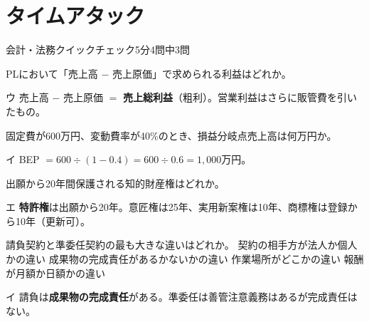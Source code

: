 \section{タイムアタック}

\begin{timeattack}{会計・法務クイックチェック}{5分}{4問中3問}

\begin{itpmon}[\diffbadge{基}]{PLにおいて「売上高 $-$ 売上原価」で求められる利益はどれか。}
\end{itpmon}
\begin{kaisetsu}{ウ}
売上高 $-$ 売上原価 $=$ \textbf{売上総利益}（粗利）。営業利益はさらに販管費を引いたもの。
\end{kaisetsu}

\begin{itpmon}[\diffbadge{標}]{固定費が600万円、変動費率が40\%のとき、損益分岐点売上高は何万円か。}
\end{itpmon}
\begin{kaisetsu}{イ}
BEP $= 600 \div (1 - 0.4) = 600 \div 0.6 = 1{,}000$万円。
\end{kaisetsu}

\begin{itpmon}[\diffbadge{基}]{出願から20年間保護される知的財産権はどれか。}
\end{itpmon}
\begin{kaisetsu}{エ}
\textbf{特許権}は出願から20年。意匠権は25年、実用新案権は10年、商標権は登録から10年（更新可）。
\end{kaisetsu}

\begin{itpmon}[\diffbadge{標}]{請負契約と準委任契約の最も大きな違いはどれか。}
\sentakushi
  {契約の相手方が法人か個人かの違い}
  {成果物の完成責任があるかないかの違い}
  {作業場所がどこかの違い}
  {報酬が月額か日額かの違い}
\end{itpmon}
\begin{kaisetsu}{イ}
請負は\textbf{成果物の完成責任}がある。準委任は善管注意義務はあるが完成責任はない。
\end{kaisetsu}

\end{timeattack}

